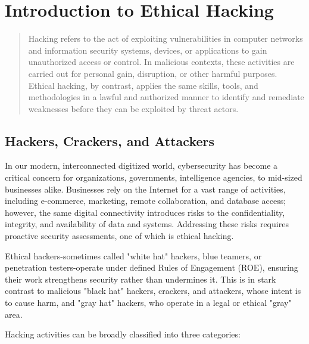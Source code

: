 %
%
%
\chapter{Introduction to Ethical Hacking}
\label{intro} %

\begin{abstract}
Hacking refers to the act of exploiting vulnerabilities in computer networks and information security systems, devices, or applications to gain unauthorized access or control. In malicious contexts, these activities are carried out for personal gain, disruption, or other harmful purposes. Ethical hacking, by contrast, applies the same skills, tools, and methodologies in a lawful and authorized manner to identify and remediate weaknesses before they can be exploited by threat actors.
\end{abstract}

\section{Hackers, Crackers, and Attackers}
In our modern, interconnected digitized world, cybersecurity has become a critical concern for organizations, governments, intelligence agencies, to mid-sized businesses alike. Businesses rely on the Internet for a vast range of activities, including e-commerce, marketing, remote collaboration, and database access; however, the same digital connectivity introduces risks to the confidentiality, integrity, and availability of data and systems. Addressing these risks requires proactive security assessments, one of which is ethical hacking.

Ethical hackers-sometimes called "white hat" hackers, blue teamers, or penetration testers-operate under defined Rules of Engagement (ROE), ensuring their work strengthens security rather than undermines it. This is in stark contrast to malicious "black hat" hackers, crackers, and attackers, whose intent is to cause harm, and "gray hat" hackers, who operate in a legal or ethical "gray" area.

Hacking activities can be broadly classified into three categories:

